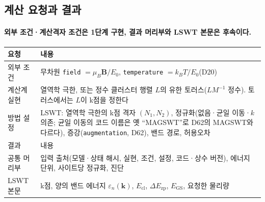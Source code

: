 \subsection{계산 요청과 결과}\label{request-result}
\begingroup%
  \framesubtitle{외부 조건·계산격자 조건은 1단계 구현, 결과 머리부와 LSWT 본문은 후속이다.}
  \small
  \begin{tabularx}{\textwidth}{@{}p{2.3cm}Y@{}}
    \toprule
    요청 & 내용 \\
    \midrule
    외부 조건 & 무차원 \texttt{field} $=\mu_B\mathbf B/E_0$, \texttt{temperature} $=k_BT/E_0$(D20) \\
    계산계 실현 & 열역학 극한, 또는 정수 클러스터 행렬 $L$의 유한 토러스($LM^{-1}$ 정수). 토러스에서는 $L$이 k점을 정한다 \\
    방법 설정 & LSWT: 열역학 극한의 k점 격자 $(N_1,N_2)$, 정규화(없음·균일 이동·$k$ 의존; 균일 이동의 코드 이름은 옛 ``MAGSWT''로 D62의 MAGSWT와 다르다), 증강(\texttt{augmentation}, D62), 밴드 경로, 허용오차 \\
    \midrule
    결과 & 내용 \\
    \midrule
    공통 머리부 & 입력 출처(모델·상태 해시, 실현, 조건, 설정, 코드·상수 버전), 에너지 단위, 사이트당 정규화, 진단 \\
    LSWT 본문 & k점, 양의 밴드 에너지 $\varepsilon_n(\mathbf k)$, $E_{\mathrm{cl}}$, $\Delta E_{\mathrm{zp}}$, $E_{\mathrm{GS}}$, 요청한 물리량 \\
    \bottomrule
  \end{tabularx}
  \par\medskip
\endgroup

